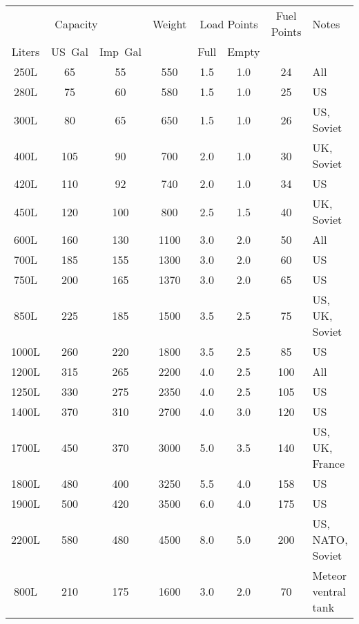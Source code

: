 \begin{twocolumntablefloat}
\begin{twocolumntable}
{
\begin{tabular}{cccccccl}
\toprule
\multicolumn{3}{c}{Capacity}&
Weight&
\multicolumn{2}{c}{Load Points}&
Fuel Points&
Notes\\
\cmidrule{1-3}
\cmidrule{5-6}
Liters&US~Gal&Imp~Gal&&Full&Empty&&\\
\midrule
\phantom{0}250L&\phantom{0}65&\phantom{0}55&\phantom{0}550&1.5&1.0&\phantom{0}24&All\\
\phantom{0}280L&\phantom{0}75&\phantom{0}60&\phantom{0}580&1.5&1.0&\phantom{0}25&US\\
\phantom{0}300L&\phantom{0}80&\phantom{0}65&\phantom{0}650&1.5&1.0&\phantom{0}26&US, Soviet\\
\phantom{0}400L&\phantom{}105&\phantom{0}90&\phantom{0}700&2.0&1.0&\phantom{0}30&UK, Soviet\\
\phantom{0}420L&\phantom{}110&\phantom{0}92&\phantom{0}740&2.0&1.0&\phantom{0}34&US\\
\phantom{0}450L&\phantom{}120&\phantom{}100&\phantom{0}800&2.5&1.5&\phantom{0}40&UK, Soviet\\
\phantom{0}600L&\phantom{}160&\phantom{}130&\phantom{}1100&3.0&2.0&\phantom{0}50&All\\
\phantom{0}700L&\phantom{}185&\phantom{}155&\phantom{}1300&3.0&2.0&\phantom{0}60&US\\
\phantom{0}750L&\phantom{}200&\phantom{}165&\phantom{}1370&3.0&2.0&\phantom{0}65&US\\
\phantom{0}850L&\phantom{}225&\phantom{}185&\phantom{}1500&3.5&2.5&\phantom{0}75&US, UK, Soviet\\
\phantom{}1000L&\phantom{}260&\phantom{}220&\phantom{}1800&3.5&2.5&\phantom{0}85&US\\
\phantom{}1200L&\phantom{}315&\phantom{}265&\phantom{}2200&4.0&2.5&\phantom{}100&All\\
\phantom{}1250L&\phantom{}330&\phantom{}275&\phantom{}2350&4.0&2.5&\phantom{}105&US\\
\phantom{}1400L&\phantom{}370&\phantom{}310&\phantom{}2700&4.0&3.0&\phantom{}120&US\\
\phantom{}1700L&\phantom{}450&\phantom{}370&\phantom{}3000&5.0&3.5&\phantom{}140&US, UK, France\\
\phantom{}1800L&\phantom{}480&\phantom{}400&\phantom{}3250&5.5&4.0&\phantom{}158&US\\
\phantom{}1900L&\phantom{}500&\phantom{}420&\phantom{}3500&6.0&4.0&\phantom{}175&US\\
\phantom{}2200L&\phantom{}580&\phantom{}480&\phantom{}4500&8.0&5.0&\phantom{}200&US, NATO, Soviet\\
\midrule
\phantom{0}800L&\phantom{}210&\phantom{}175&\phantom{}1600&3.0&2.0&\phantom{0}70&Meteor ventral tank\\
\bottomrule
\end{tabular}

}
\end{twocolumntable}
\end{twocolumntablefloat}